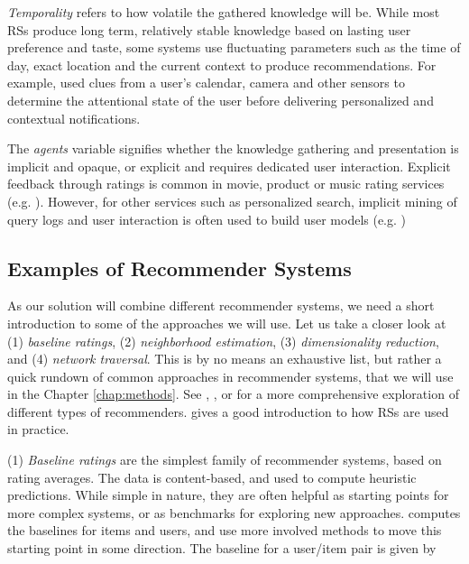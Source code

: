 \emph{Temporality} refers to how volatile the gathered knowledge will be.
While most RSs produce long term, relatively stable knowledge based on lasting user preference and taste, 
some systems use fluctuating parameters such as the time of day, exact location and the current context to produce recommendations.
For example, \cite{Horvitz} used clues from a user's calendar, camera and other sensors to determine the attentional state
of the user before delivering personalized and contextual notifications.

The \emph{agents} variable signifies whether the knowledge gathering and presentation is implicit and opaque, 
or explicit and requires dedicated user interaction. Explicit feedback through ratings is 
common in movie, product or music rating services (e.g. \cite{Bell2007, Basu1998, Hotho}). However, for other services such as personalized search,
implicit mining of query logs and user interaction is often used to build user models (e.g. \cite{Shen2005, Agichtein2006, Speretta2000, Teevan2005})


\subsection{Examples of Recommender Systems}
\label{subsec:recommender:examples}

As our solution will combine different recommender systems, we need a short introduction to some of the approaches we will use.
Let us take a closer look at (1) \emph{baseline ratings}, (2) \emph{neighborhood estimation}, (3) \emph{dimensionality reduction}, 
and (4) \emph{network traversal}. This is by no means an exhaustive list, but rather
a quick rundown of common approaches in recommender systems, that we will use in the Chapter \ref{chap:methods}.
See \cite{Adomavicius2005}, \cite{Pazzani2007}, \cite{Schafer2007} or \cite{Bjorkoy2010d} for a more comprehensive exploration of different types of recommenders.
\cite{Segaran2007} gives a good introduction to how RSs are used in practice.

(1) \emph{Baseline ratings} are the simplest family of recommender systems, based on rating averages.
The data is content-based, and used to compute heuristic predictions.
While simple in nature, they are often helpful as starting points for more complex systems, or as 
benchmarks for exploring new approaches. \cite[p2]{Koren2008} computes the baselines for items and users, and
use more involved methods to move this starting point in some direction. 
The baseline for a user/item pair is given by

